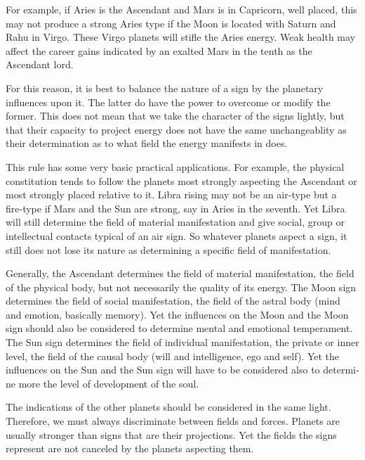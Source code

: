  

For example, if Aries is the Ascendant and Mars is in Capricorn, well placed, this may not produce a strong Aries type if the Moon is located with Saturn and Rahu in Virgo. These Virgo planets will stifle the Aries energy. Weak health may affect the career gains indicated by an exalted Mars in the tenth as the Ascendant lord.

 

For this reason, it is best to balance the nature of a sign by the planetary influences upon it. The latter do have the power to overcome or modify the former. This does not mean that we take the character of the signs lightly, but that their capacity to project energy does not have the same unchangeablity as their determination as to what field the energy manifests in does.

 

This rule has some very basic practical applications. For example, the physical constitution tends to follow the planets most strongly aspecting the Ascendant or most strongly placed relative to it. Libra rising may not be an air‑type but a fire‑type if Mars and the Sun are strong, say in Aries in the seventh. Yet Libra will still determine the field of material manifestation and give social, group or intellectual contacts typical of an air sign. So whatever planets aspect­ a sign, it still does not lose its nature as determining a specific field of manifestation.

 

Generally, the Ascendant determines the field of material manifestation, the field of the physical body, but not necessarily the quality of its energy.
The Moon sign determines the field of social manifestation, the field of the astral body (mind and emotion, basically memory). Yet the influences on the Moon and the Moon sign should also be considered to determine mental and emotional tempera­ment.
The Sun sign determines the field of individual manifestation, the private or inner level, the field of the causal body (will and intelligence, ego and self). Yet the influences on the Sun and the Sun sign will have to be considered also to determi­ne more the level of develop­ment of the soul.
 

The indications of the other planets should be considered in the same light. Therefore, we must always discriminate between fields and forces. Planets are usually stronger than signs that are their projections. Yet the fields the signs represent are not canceled by the planets aspecting them.

